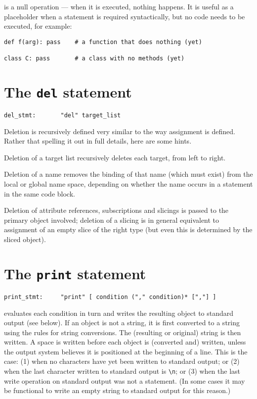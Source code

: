 is a null operation --- when it is executed, nothing
happens.  It is useful as a placeholder when a statement is
required syntactically, but no code needs to be executed, for example:

\begin{verbatim}
def f(arg): pass    # a function that does nothing (yet)

class C: pass       # a class with no methods (yet)
\end{verbatim}

\section{The {\tt del} statement}

\begin{verbatim}
del_stmt:       "del" target_list
\end{verbatim}

Deletion is recursively defined very similar to the way assignment is
defined. Rather that spelling it out in full details, here are some
hints.

Deletion of a target list recursively deletes each target, from left
to right.

Deletion of a name removes the binding of that name (which must exist)
from the local or global name space, depending on whether the name
occurs in a  statement in the same code block.

Deletion of attribute references, subscriptions and slicings
is passed to the primary object involved; deletion of a slicing
is in general equivalent to assignment of an empty slice of the
right type (but even this is determined by the sliced object).

\section{The {\tt print} statement} \label{print}

\begin{verbatim}
print_stmt:     "print" [ condition ("," condition)* [","] ]
\end{verbatim}

 evaluates each condition in turn and writes the resulting
object to standard output (see below).  If an object is not a string,
it is first converted to a string using the rules for string
conversions.  The (resulting or original) string is then written.  A
space is written before each object is (converted and) written, unless
the output system believes it is positioned at the beginning of a
line.  This is the case: (1) when no characters have yet been written
to standard output; or (2) when the last character written to standard
output is \verb/\n/; or (3) when the last write operation on standard
output was not a  statement.  (In some cases it may be
functional to write an empty string to standard output for this
reason.)

